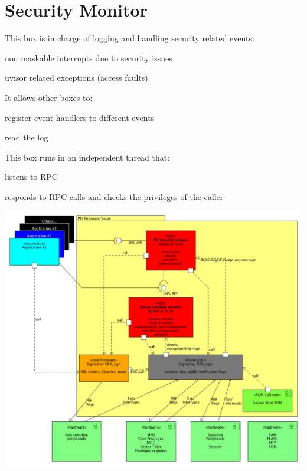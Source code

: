 \hypertarget{group__smbx}{}\section{Security Monitor}
\label{group__smbx}
This box is in charge of logging and handling security related events\+:
\begin{DoxyItemize}
\item non maskable interrupts due to security issues
\item uvisor related exceptions (access faults)
\end{DoxyItemize}

It allows other boxes to\+:
\begin{DoxyItemize}
\item register event handlers to different events
\item read the log
\end{DoxyItemize}

This box runs in an independent thread that\+:
\begin{DoxyItemize}
\item listens to R\+PC
\item responds to R\+PC calls and checks the privileges of the caller
\end{DoxyItemize}


\begin{DoxyImageNoCaption}
  \mbox{\includegraphics[width=\textwidth,height=\textheight/2,keepaspectratio=true]{pci_cortex.png}}
\end{DoxyImageNoCaption}
  